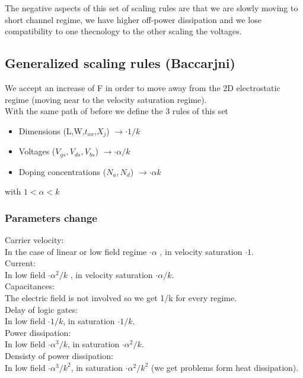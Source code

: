 \vspace{5mm} %

The negative aspects of this set of scaling rules are that we are slowly moving to short channel regime, we have higher off-power dissipation and we lose compatibility to one thecnology to the other scaling the voltages.


\subsection{Generalized scaling rules (Baccarjni)}
We accept an increase of F in order to move away from the 2D electrostatic regime (moving near to the velocity saturation regime).\\
\vspace{5mm}
With the same path of before we define the 3 rules of this set 
\begin{itemize}
  \item Dimensions (L,W,$t_{ox}$,$X_j$)     $\rightarrow \cdot 1/k$
  \item Voltages ($V_{gs},V_{ds},V_{bs}$)   $\rightarrow \cdot \alpha/k$
  \item Doping concentrations ($N_a,N_d$)   $\rightarrow \cdot \alpha k$
\end{itemize}
with $1<\alpha<k$ 

\subsubsection{Parameters change}
\tab Carrier velocity:\\
In the case of linear or low field regime $\cdot \alpha$ , in velocity saturation $\cdot 1$.\\
\tab Current:\\
In low field $\cdot \alpha^2/k$ , in velocity saturation $\cdot \alpha/k$.\\
\tab Capacitances:\\
The electric field is not involved so we get 1/k for every regime.\\
\tab Delay of logic gates:\\
In low field $\cdot 1/k$, in saturation $\cdot 1/k$.\\
\tab Power dissipation:\\
In low field $\cdot \alpha^3/k$, in saturation $\cdot \alpha^2/k$.\\
\tab Densisty of power dissipation:\\
In low field $\cdot \alpha^3/k^2$, in saturation $\cdot \alpha^2/k^2$ (we get problems form heat dissipation).\\

